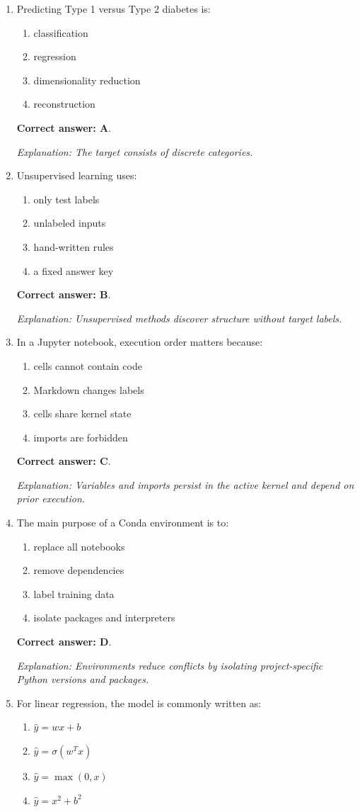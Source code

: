 \documentclass[10pt,a4paper]{article}
\newcommand{\ans}[1]{\par\textbf{Correct answer: #1}}
\newcommand{\expn}[1]{\par\textit{Explanation: #1}}
\begin{document}
\begin{enumerate}[label=\textbf{\arabic*.},itemsep=4pt]
\ans{D}. \expn{Blood glucose is a continuous target, so the task is regression.}
\item Predicting Type 1 versus Type 2 diabetes is:
\begin{enumerate}[label=\Alph*.,itemsep=0pt]\item classification\item regression\item dimensionality reduction\item reconstruction\end{enumerate}
\ans{A}. \expn{The target consists of discrete categories.}
\item Unsupervised learning uses:
\begin{enumerate}[label=\Alph*.,itemsep=0pt]\item only test labels\item unlabeled inputs\item hand-written rules\item a fixed answer key\end{enumerate}
\ans{B}. \expn{Unsupervised methods discover structure without target labels.}
\item In a Jupyter notebook, execution order matters because:
\begin{enumerate}[label=\Alph*.,itemsep=0pt]\item cells cannot contain code\item Markdown changes labels\item cells share kernel state\item imports are forbidden\end{enumerate}
\ans{C}. \expn{Variables and imports persist in the active kernel and depend on prior execution.}
\item The main purpose of a Conda environment is to:
\begin{enumerate}[label=\Alph*.,itemsep=0pt]\item replace all notebooks\item remove dependencies\item label training data\item isolate packages and interpreters\end{enumerate}
\ans{D}. \expn{Environments reduce conflicts by isolating project-specific Python versions and packages.}
\item For linear regression, the model is commonly written as:
\begin{enumerate}[label=\Alph*.,itemsep=0pt]\item $\hat y=wx+b$\item $\hat y=\sigma(w^Tx)$\item $\hat y=\max(0,x)$\item $\hat y=x^2+b^2$\end{enumerate}

\end{enumerate}
\end{document}

